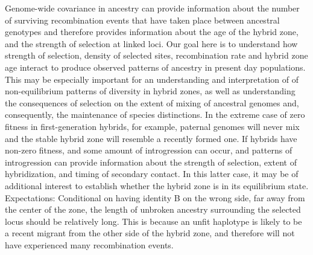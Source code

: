 \documentclass[12pt]{article}
\begin{document}
 Genome-wide covariance in ancestry can provide information about the number of surviving recombination events that have taken place between ancestral genotypes and therefore provides information about the age of the hybrid zone, and the strength of selection at linked loci. Our goal here is  to understand how strength of selection, density of selected sites, recombination rate and hybrid zone age interact to produce observed patterns of ancestry in present day populations. This may be especially important for an understanding and interpretation of of non-equilibrium patterns of diversity in hybrid zones, as well as understanding the consequences of selection on the extent of mixing of ancestral genomes and, consequently, the maintenance of species distinctions. In the extreme case of zero fitness in first-generation hybrids, for example, paternal genomes will never mix and the stable hybrid zone will resemble a recently formed one. If hybrids have non-zero fitness, and some amount of introgression can occur, and patterns of introgression can provide information about the strength of selection, extent of hybridization, and timing of secondary contact. In this latter case, it may be of additional interest to establish whether the hybrid zone is in its equilibrium state. \\

Expectations:
Conditional  on having identity B on the wrong side, far away from the center of the zone, the length of unbroken ancestry surrounding the selected locus should be relatively long. This is because an unfit haplotype is likely to be a recent migrant from the other side of the hybrid zone, and therefore will not have experienced many recombination events. 


\end{document}
